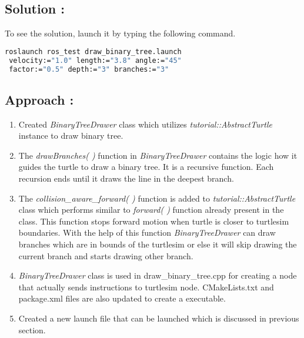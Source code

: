 \documentclass[12pt]{article}
\begin{document}
\subsection{Solution :}
To see the solution, launch it by typing the following command.
\begin{lstlisting}[language=bash]
roslaunch ros_test draw_binary_tree.launch 
 velocity:="1.0" length:="3.8" angle:="45" 
 factor:="0.5" depth:="3" branches:="3"
\end{lstlisting}

\subsection{Approach :}
\begin{enumerate}
\item Created \textit{BinaryTreeDrawer} class which utilizes \textit{tutorial::AbstractTurtle} instance to draw binary tree.
\item The \textit{drawBranches(   )} function in \textit{BinaryTreeDrawer} contains the logic how it guides the turtle to draw a binary tree. It is a recursive function. Each recursion ends until it draws the line in the deepest branch.
\item The \textit{collision\_aware\_forward(   )} function is added to \textit{tutorial::AbstractTurtle} class which performs similar to \textit{forward(  )} function already present in the class. This function stops forward motion when turtle is closer to turtlesim boundaries. With the help of this function \textit{BinaryTreeDrawer} can draw branches which are in bounds of the turtlesim or else it will skip drawing the current branch and starts drawing other branch.
\item \textit{BinaryTreeDrawer} class is used in draw\_binary\_tree.cpp for creating a node that actually sends instructions to turtlesim node. CMakeLists.txt and package.xml files are also updated to create a executable.
\item Created a new launch file that can be launched which is discussed in previous section.
\end{enumerate}
\end{document}

